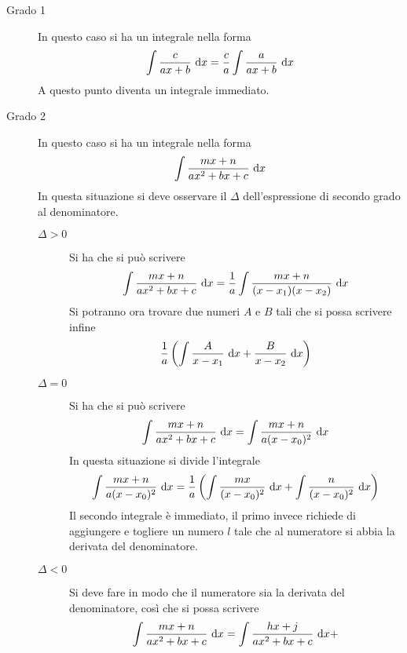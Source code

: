\begin{description}
  \item[Grado 1] In questo caso si ha un integrale nella forma
    \begin{equation*}
      \int \frac{c}{ax+b}\,\mathop{}\!\mathrm{d} x = \frac{c}{a}\int \frac{a}{ax+b}\,\mathop{}\!\mathrm{d} x
    \end{equation*}
    A questo punto diventa un integrale immediato.
  \item[Grado 2] In questo caso si ha un integrale nella forma
    \begin{equation*}
      \int \frac{mx+n}{ax^2+bx+c}\,\mathop{}\!\mathrm{d} x
    \end{equation*}
    In questa situazione si deve osservare il $\Delta$ dell'espressione di secondo grado al 
    denominatore.
    \begin{description}
      \item[$\Delta > 0$] Si ha che si può scrivere 
        \begin{equation*}
          \int \frac{mx+n}{ax^2+bx+c}\,\mathop{}\!\mathrm{d} x = \frac{1}{a} \int\frac{mx+n}{(x-x_1)(x-x_2)}\,\mathop{}\!\mathrm{d} x
        \end{equation*}
        Si potranno ora trovare due numeri $A$ e $B$ tali che si possa scrivere infine
        \begin{equation*}
          \frac{1}{a} \left( \int \frac{A}{x-x_1}\,\mathop{}\!\mathrm{d} x + \frac{B}{x-x_2}\,\mathop{}\!\mathrm{d} x \right)
        \end{equation*}
      \item[$\Delta =0 $] Si ha che si può scrivere
        \begin{equation*}
          \int \frac{mx+n}{ax^2+bx+c}\,\mathop{}\!\mathrm{d} x = \int \frac{mx+n}{a(x-x_0)^2}\,\mathop{}\!\mathrm{d} x 
        \end{equation*}
        In questa situazione si divide l'integrale
        \begin{equation*}
          \int \frac{mx+n}{a(x-x_0)^2}\,\mathop{}\!\mathrm{d} x = 
          \frac{1}{a}\left( \int\frac{mx}{(x-x_0)^2}\,\mathop{}\!\mathrm{d} x+\int\frac{n}{(x-x_0)^2}\,\mathop{}\!\mathrm{d} x\right)
        \end{equation*}
        Il secondo integrale è immediato, il primo invece richiede di aggiungere e togliere un
        numero $l$ tale che al numeratore si abbia la derivata del denominatore.
      \item[$\Delta < 0$] Si deve fare in modo che il numeratore sia la derivata del denominatore,
        così che si possa scrivere
        \begin{equation*}
          \int \frac{mx+n}{ax^2+bx+c}\,\dif x = \int \frac{hx+j}{ax^2+bx+c}\,\dif x + 

\end{equation*}
\end{description}
\end{description}
